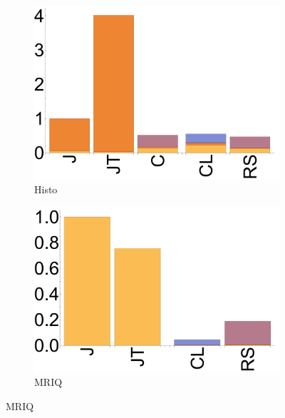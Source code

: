 \begin{figure}[ht]
  \begin{subfigure}[b]{0.5\textwidth}
      \centering
      \includegraphics[width=\textwidth]{data/bbattery_histogram_nexus5.pdf}
      \caption{Histo}\label{fig:histo}
  \end{subfigure}

  \begin{subfigure}[b]{0.5\textwidth}
      \centering
      \includegraphics[width=\textwidth]{data/bbattery_mriq_nexus5.pdf}
      \caption{MRIQ}
      \label{fig:MRIQ}
  \end{subfigure}


\end{figure}
